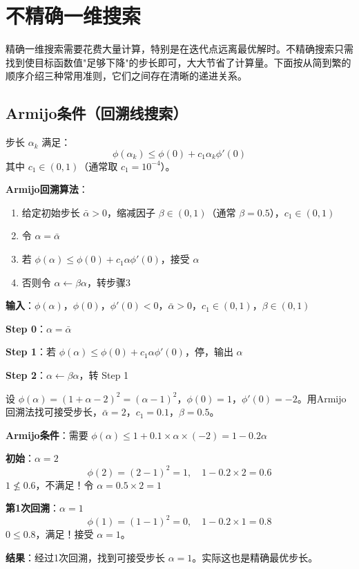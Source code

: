 \section{不精确一维搜索}\label{sec:ch4-inexact}

精确一维搜索需要花费大量计算，特别是在迭代点远离最优解时。不精确搜索只需找到使目标函数值"足够下降"的步长即可，大大节省了计算量。下面按从简到繁的顺序介绍三种常用准则，它们之间存在清晰的递进关系。

\subsection{Armijo条件（回溯线搜索）}\label{sec:armijo}

\begin{conceptbox}[Armijo条件]
步长 $\alpha_k$ 满足：
\[
\phi(\alpha_k) \leq \phi(0) + c_1 \alpha_k \phi'(0)
\]
其中 $c_1 \in (0, 1)$（通常取 $c_1 = 10^{-4}$）。

\textbf{Armijo回溯算法}：
\begin{enumerate}[label=\arabic*., leftmargin=2em]
    \item 给定初始步长 $\bar{\alpha} > 0$，缩减因子 $\beta \in (0, 1)$（通常 $\beta = 0.5$），$c_1 \in (0, 1)$
    \item 令 $\alpha = \bar{\alpha}$
    \item 若 $\phi(\alpha) \leq \phi(0) + c_1 \alpha \phi'(0)$，接受 $\alpha$
    \item 否则令 $\alpha \leftarrow \beta \alpha$，转步骤3
\end{enumerate}
\end{conceptbox}

\begin{algobox}[Armijo回溯法算法]
\textbf{输入}：$\phi(\alpha)$，$\phi(0)$，$\phi'(0) < 0$，$\bar{\alpha} > 0$，$c_1 \in (0,1)$，$\beta \in (0,1)$

\textbf{Step 0}：$\alpha = \bar{\alpha}$

\textbf{Step 1}：若 $\phi(\alpha) \leq \phi(0) + c_1 \alpha \phi'(0)$，停，输出 $\alpha$

\textbf{Step 2}：$\alpha \leftarrow \beta \alpha$，转 Step 1
\end{algobox}

\begin{example}\label{ex:armijo}
设 $\phi(\alpha) = (1+\alpha-2)^2 = (\alpha-1)^2$，$\phi(0) = 1$，$\phi'(0) = -2$。用Armijo回溯法找可接受步长，$\bar{\alpha} = 2$，$c_1 = 0.1$，$\beta = 0.5$。

\textbf{Armijo条件}：需要 $\phi(\alpha) \leq 1 + 0.1 \times \alpha \times (-2) = 1 - 0.2\alpha$

\textbf{初始}：$\alpha = 2$
\[
\phi(2) = (2-1)^2 = 1,\quad 1 - 0.2 \times 2 = 0.6
\]
$1 \not\leq 0.6$，不满足！令 $\alpha = 0.5 \times 2 = 1$

\textbf{第1次回溯}：$\alpha = 1$
\[
\phi(1) = (1-1)^2 = 0,\quad 1 - 0.2 \times 1 = 0.8
\]
$0 \leq 0.8$，满足！接受 $\alpha = 1$。

\textbf{结果}：经过1次回溯，找到可接受步长 $\alpha = 1$。实际这也是精确最优步长。
\end{example}

